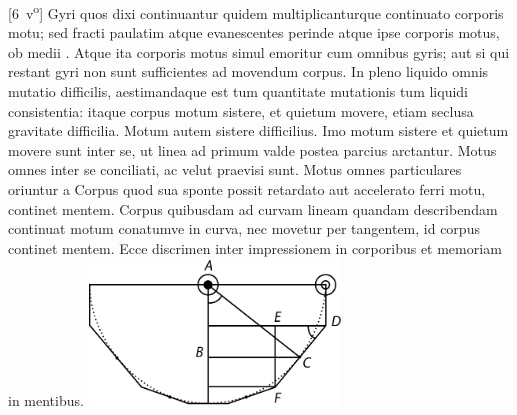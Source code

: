 [6~v\textsuperscript{o}]
Gyri quos dixi continuantur quidem multiplicanturque continuato corporis motu;
sed fracti paulatim atque evanescentes perinde atque ipse corporis motus, ob medii
.
Atque ita corporis motus simul emoritur cum omnibus gyris;
aut si qui restant gyri non sunt sufficientes ad movendum corpus.
\pend
\pstart 
In pleno liquido omnis mutatio difficilis, aestimandaque est tum quantitate mutationis tum liquidi consistentia:
itaque corpus motum sistere, et quietum movere, etiam seclusa gravitate\protect{} difficilia.
Motum autem sistere difficilius.
Imo motum sistere et quietum movere sunt inter se, ut linea ad
primum valde postea parcius arctantur.
Motus omnes inter se conciliati, ac velut praevisi sunt.
\pend
\count{}
\pstart
Motus omnes particulares oriuntur a 
\pend
\pstart
Corpus quod sua sponte possit retardato aut accelerato ferri motu, continet mentem.
\pend
\pstart
Corpus 
quibusdam ad curvam lineam quandam describendam
continuat motum conatumve in curva, nec movetur per tangentem, id corpus continet mentem.
\pend
\pstart
Ecce discrimen inter impressionem in corporibus et memoriam in mentibus.
\pend
\count{}
\count{}
\count{}
\newpage
 \pstart
 \noindent
 \centering
   \includegraphics[trim = 0mm -3mm 0mm 0mm, clip, width=0.5\textwidth]{images/lh03705_006v-d1.pdf}\\
